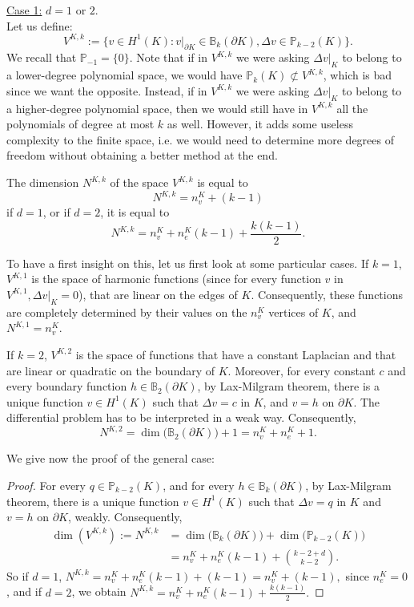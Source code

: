 \noindent \underline{Case 1:} $d=1$ or $2$. \\
\noindent Let us define:
$$ V^{K,k} := \Big\{ v\in H^1(K) : v|_{\partial K} \in \mathbb{B}_k(\partial K), \Delta v \in \mathbb{P}_{k-2}(K)\Big\}.$$
We recall that $\mathbb{P}_{-1} = \{0\}$. Note that if in $V^{K,k}$ we were asking $\Delta v|_K$ to belong to a lower-degree polynomial space, we would have $\mathbb{P}_k(K)\not\subset V^{K,k}$, which is bad since we want the opposite. Instead, if in $V^{K,k}$ we were asking $\Delta v|_K$ to belong to a higher-degree polynomial space, then we would still have in $V^{K,k}$ all the polynomials of degree at most $k$ as well. However, it adds some useless complexity to the finite space, i.e. we would need to determine more degrees of freedom without obtaining a better method at the end.

\begin{proposition}
The dimension $N^{K,k}$ of the space $V^{K,k}$ is equal to $$N^{K,k} = n_v^K +(k-1)$$ if $d=1$, or if $d=2$, it is equal to $$N^{K,k} = n_v^K + n_e^K(k-1) + \frac{k(k-1)}{2}.$$
\end{proposition}
To have a first insight on this, let us first look at some particular cases. If $k=1$, $V^{K,1}$ is the space of harmonic functions (since for every function $v$ in $V^{K,1}, \Delta v|_K = 0$), that are linear on the edges of $K$. Consequently, these functions are completely determined by their values on the $n_v^K$ vertices of $K$, and $N^{K,1} = n_v^K$. 

If $k=2$, $V^{K,2}$ is the space of functions that have a constant Laplacian and that are linear or quadratic on the boundary of $K$. Moreover, for every constant $c$ and every boundary function $h\in \mathbb{B}_2(\partial K)$, by Lax-Milgram theorem, there is a unique function $v\in H^1(K)$ such that $\Delta v = c$ in $K$, and $v = h$ on $\partial K$. The differential problem has to be interpreted in a weak way. Consequently, $$N^{K,2} = \dim\big(\mathbb{B}_2(\partial K)\big)+1 = n_v^K + n_e^K+1.$$

We give now the proof of the general case:
\begin{proof}
For every $q\in \mathbb{P}_{k-2}(K)$, and for every $h\in \mathbb{B}_k(\partial K)$, by Lax-Milgram theorem, there is a unique function $v\in H^1(K)$ such that $\Delta v = q$ in $K$ and $v = h$ on $\partial K$, weakly. Consequently, 
\begin{align*}\dim\left(V^{K,k}\right) := N^{K,k} &= \dim\big(\mathbb{B}_k\left(\partial K\right)\big)+\dim\big(\mathbb{P}_{k-2}(K)\big)\\
&= n_v^K + n_e^K(k-1) + \binom{k-2+d}{k-2}.
\end{align*}
So if $d=1$, 
$N^{K,k} = n_v^K + n_e^K(k-1) + (k-1) = n_v^K + (k-1),$ since $n_e^K=0$, and if $d=2$, we obtain $N^{K,k} = n_v^K + n_e^K(k-1) + \frac{k(k-1)}{2}.$
\end{proof}

